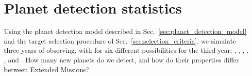 \section{Planet detection statistics}  
\label{sec:newly_detected_planet_metrics}

Using the planet detection model described in Sec.~\ref{sec:planet_detection_model} and the target selection procedure of Sec.~\ref{sec:selection_criteria}, we simulate three years of \tess observing, with for six different possibilities for the third year:
\nhemi, \npole, \shemiAvoid, \elong, \eshort, and \hemis.
How many new planets do we detect, and how do their properties differ between Extended Missions?








